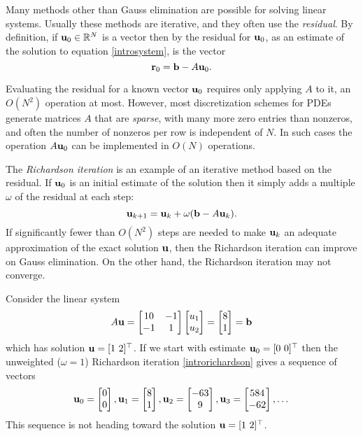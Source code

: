 Many methods other than Gauss elimination are possible for solving linear systems.  Usually these methods are iterative, and they often use the \emph{residual}.  By definition, if $\mathbf{u}_0\in \mathbb{R}^N$ is a vector then by the residual for $\mathbf{u}_0$, as an estimate of the solution to equation \eqref{introsystem}, is the vector
\begin{equation}
\mathbf{r}_0 = \mathbf{b} - A \mathbf{u}_0. \label{residualdefn}
\end{equation}

Evaluating the residual for a known vector $\mathbf{u}_0$ requires only applying $A$ to it, an $O(N^2)$ operation at most.  However, most discretization schemes for PDEs generate matrices $A$ that are \emph{sparse}, with many more zero entries than nonzeros, and often the number of nonzeros per row is independent of $N$.  In such cases the operation $A\mathbf{u}_0$ can be implemented in $O(N)$ operations.

The \emph{Richardson iteration} is an example of an iterative method based on the residual.  If $\mathbf{u}_0$ is an initial estimate of the solution then it simply adds a multiple $\omega$ of the residual at each step:
\begin{equation}
\mathbf{u}_{k+1} = \mathbf{u}_k + \omega (\mathbf{b} - A \mathbf{u}_k).  \label{introrichardson}
\end{equation}
If significantly fewer than $O(N^2)$ steps are needed to make $\mathbf{u}_k$ an adequate approximation of the exact solution $\mathbf{u}$, then the Richardson iteration can improve on Gauss elimination.  On the other hand, the Richardson iteration may not converge.

\newcommand{\rvect}[3]{\ensuremath{\bu_{#1} = \begin{bmatrix} #2 \\ #3 \end{bmatrix}}}

\medskip\noindent\hrulefill
\begin{example} Consider the linear system
\begin{equation}
A \mathbf{u}
= \begin{bmatrix}
10 & -1 \\ -1 & 1
\end{bmatrix}
\begin{bmatrix} u_1 \\ u_2 \end{bmatrix}
= \begin{bmatrix} 8 \\ 1 \end{bmatrix}
= \mathbf{b}
 \label{introexample}
\end{equation}
which has solution $\mathbf{u} = [1\,\, 2]^\top$.  If we start with estimate $\mathbf{u}_0 = [0\,\, 0]^\top$ then the unweighted ($\omega=1$) Richardson iteration \eqref{introrichardson} gives a sequence of vectors %
\begin{equation}
\rvect{0}{0}{0}, \rvect{1}{8}{1}, \rvect{2}{-63}{9}, \rvect{3}{584}{-62}, \dots
\end{equation}
This sequence is not heading toward the solution $\mathbf{u} = [1\,\, 2]^\top$.
\end{example}
\noindent\hrulefill

